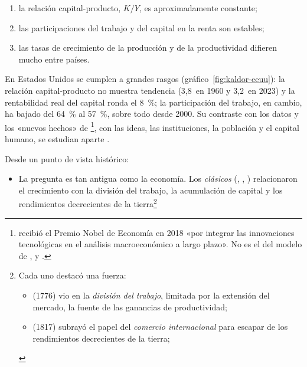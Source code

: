 \documentclass[11pt]{article}
\begin{document}
\begin{itemize}
\begin{itemize}
\begin{anotaciones}
\begin{enumerate}
  \item la relación capital-producto, $K/Y$, es aproximadamente constante;
  \item las participaciones del trabajo y del capital en la renta son estables;
  \item las tasas de crecimiento de la producción y de la productividad difieren mucho entre países.
  \end{enumerate}
  En Estados Unidos se cumplen a grandes rasgos (gráfico~\ref{fig:kaldor-eeuu}): la relación capital-producto no muestra tendencia (3,8~en 1960 y 3,2~en 2023) y la rentabilidad real del capital ronda el 8~\%; la participación del trabajo, en cambio, ha bajado del 64~\% al 57~\%, sobre todo desde 2000\nocite{GGDC2025PWT,CE2026AMECO}. Su contraste con los datos y los «nuevos hechos» de \textcite{JonesRomer2010}\footnote{ recibió el Premio Nobel de Economía en 2018 «por integrar las innovaciones tecnológicas en el análisis macroeconómico a largo plazo»\nocite{Nobel2018Romer}. No es el  del modelo de ,  y .}, con las ideas, las instituciones, la población y el capital humano, se estudian aparte .
  \begin{figuracaja}
  \caption{Los hechos de  en Estados Unidos, 1950-2025: relación capital-producto, participación del trabajo y rentabilidad real del capital}\label{fig:kaldor-eeuu}
  \end{figuracaja}
  \end{anotaciones}
  Desde un punto de vista histórico:
  \begin{itemize}
  \item La pregunta es tan antigua como la economía. Los \emph{clásicos} (, , ) relacionaron el crecimiento con la división del trabajo, la acumulación de capital y los rendimientos decrecientes de la tierra\footnote{Cada uno destacó una fuerza:
\begin{itemize}
\item {} (1776) vio en la \emph{división del trabajo}, limitada por la extensión del mercado, la fuente de las ganancias de productividad;
\item {} (1817) subrayó el papel del \emph{comercio internacional} para escapar de los rendimientos decrecientes de la tierra;

\end{itemize}}
\end{itemize}
\end{itemize}
\end{itemize}
\end{document}
